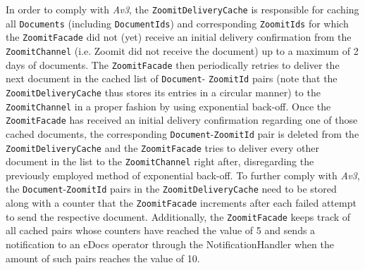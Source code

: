 \documentclass[a4paper,10pt]{article}
\begin{document}
In order to comply with \textit{Av3}, the \texttt{ZoomitDeliveryCache} is responsible for caching all \texttt{Documents} (including \texttt{DocumentIds}) and corresponding \texttt{ZoomitIds} for which the \texttt{ZoomitFacade} did not (yet) receive an initial delivery confirmation from the \texttt{ZoomitChannel} (i.e. Zoomit did not receive the document) up to a maximum of 2 days of documents. The \texttt{ZoomitFacade} then periodically retries to deliver the next document in the cached list of \texttt{Document}- \texttt{ZoomitId} pairs (note that the \texttt{ZoomitDeliveryCache} thus stores its entries in a circular manner) to the \texttt{ZoomitChannel} in a proper fashion by using exponential back-off. Once the \texttt{ZoomitFacade} has received an initial delivery confirmation regarding one of those cached documents, the corresponding \texttt{Document}-\texttt{ZoomitId} pair is deleted from the \texttt{ZoomitDeliveryCache} and the \texttt{ZoomitFacade} tries to deliver every other document in the list to the \texttt{ZoomitChannel} right after, disregarding the previously employed method of exponential back-off. To further comply with \textit{Av3}, the \texttt{Document}-\texttt{ZoomitId} pairs in the \texttt{ZoomitDeliveryCache} need to be stored along with a counter that the \texttt{ZoomitFacade} increments after each failed attempt to send the respective document. Additionally, the \texttt{ZoomitFacade} keeps track of all cached pairs whose counters have reached the value of 5 and sends a notification to an eDocs operator through the NotificationHandler when the amount of such pairs reaches the value of 10.
\end{document}
